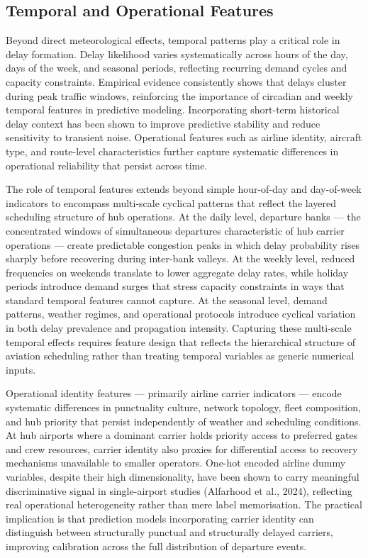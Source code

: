 \documentclass{report}
\begin{document}
\subsection{Temporal and Operational Features}

Beyond direct meteorological effects, temporal patterns play a critical role in delay formation. Delay likelihood varies systematically across hours of the day, days of the week, and seasonal periods, reflecting recurring demand cycles and capacity constraints. Empirical evidence consistently shows that delays cluster during peak traffic windows, reinforcing the importance of circadian and weekly temporal features in predictive modeling. Incorporating short-term historical delay context has been shown to improve predictive stability and reduce sensitivity to transient noise. Operational features such as airline identity, aircraft type, and route-level characteristics further capture systematic differences in operational reliability that persist across time.

The role of temporal features extends beyond simple hour-of-day and 
day-of-week indicators to encompass multi-scale cyclical patterns that 
reflect the layered scheduling structure of hub operations. At the daily 
level, departure banks --- the concentrated windows of simultaneous 
departures characteristic of hub carrier operations --- create predictable 
congestion peaks in which delay probability rises sharply before recovering 
during inter-bank valleys. At the weekly level, reduced frequencies on 
weekends translate to lower aggregate delay rates, while holiday periods 
introduce demand surges that stress capacity constraints in ways that 
standard temporal features cannot capture. At the seasonal level, demand 
patterns, weather regimes, and operational protocols introduce cyclical 
variation in both delay prevalence and propagation intensity. Capturing 
these multi-scale temporal effects requires feature design that reflects 
the hierarchical structure of aviation scheduling rather than treating 
temporal variables as generic numerical inputs.

Operational identity features --- primarily airline carrier indicators --- 
encode systematic differences in punctuality culture, network topology, 
fleet composition, and hub priority that persist independently of weather 
and scheduling conditions. At hub airports where a dominant carrier holds 
priority access to preferred gates and crew resources, carrier identity 
also proxies for differential access to recovery mechanisms unavailable to 
smaller operators. One-hot encoded airline dummy variables, despite their 
high dimensionality, have been shown to carry meaningful discriminative 
signal in single-airport studies (Alfarhood et al., 2024), reflecting real 
operational heterogeneity rather than mere label memorisation. The practical 
implication is that prediction models incorporating carrier identity can 
distinguish between structurally punctual and structurally delayed carriers, 
improving calibration across the full distribution of departure events.
\end{document}
